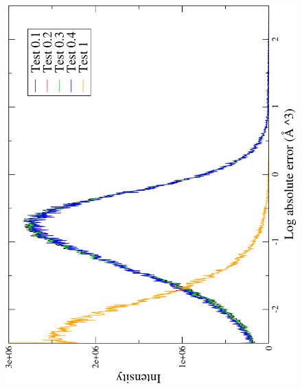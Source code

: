 \begin{figure}[h]
\begin{minipage}[t]{1\textwidth}
\begin{center}
\includegraphics[angle=-90,scale=0.35]{_figure/c_local_to_global_coordinates_32_96/log_absolute_error}
\par\end{center}
\begin{center}

\end{center}
\end{minipage}
\end{figure}
